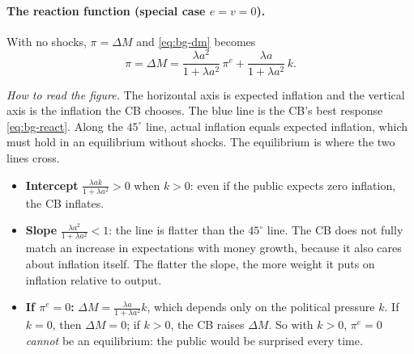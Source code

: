 \paragraph{The reaction function (special case $e=v=0$).} With no shocks, $\pi=\Delta M$ and \eqref{eq:bg-dm} becomes
\begin{equation}
\pi=\Delta M=\frac{\lambda a^2}{1+\lambda a^2}\,\pi^e+\frac{\lambda a}{1+\lambda a^2}\,k .\label{eq:bg-react}
\end{equation}
\begin{center}
\end{center}
\emph{How to read the figure.} The horizontal axis is expected inflation and the vertical axis is the inflation the CB chooses. The blue line is the CB's best response \eqref{eq:bg-react}. Along the $45^\circ$ line, actual inflation equals expected inflation, which must hold in an equilibrium without shocks. The equilibrium is where the two lines cross.
\begin{itemize}
  \item \textbf{Intercept} $\frac{\lambda ak}{1+\lambda a^2}>0$ when $k>0$: even if the public expects zero inflation, the CB inflates.
  \item \textbf{Slope} $\frac{\lambda a^2}{1+\lambda a^2}<1$: the line is flatter than the $45^\circ$ line. The CB does not fully match an increase in expectations with money growth, because it also cares about inflation itself. The flatter the slope, the more weight it puts on inflation relative to output.
  \item \textbf{If $\pi^e=0$:} $\Delta M=\frac{\lambda a}{1+\lambda a^2}k$, which depends only on the political pressure $k$. If $k=0$, then $\Delta M=0$; if $k>0$, the CB raises $\Delta M$. So with $k>0$, $\pi^e=0$ \emph{cannot} be an equilibrium: the public would be surprised every time.
\end{itemize}

